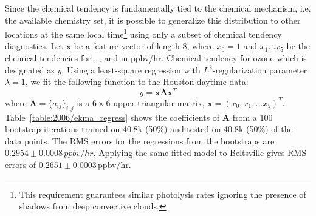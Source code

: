 Since the chemical tendency is fundamentally tied to the chemical mechanism, i.e. the available chemistry set, it is possible to generalize this distribution to other
locations at the same local time\footnote{This requirement guarantees similar photolysis rates ignoring the presence of shadows from deep convective clouds.}
using only a subset of chemical tendency diagnostics. Let $\mathbf{x}$ be a feature vector of length 8, where $x_0=1$ and $x_1\ldots x_5$ be the chemical
tendencies for , , and  in \unit{ppbv/hr}. Chemical tendency for ozone which is designated as $y$. Using a least-square
regression with $L^2$-regularization parameter $\lambda=1$, we fit the following function to the Houston daytime data:
\begin{equation}\label{eqn:chem_ekma}
	y = \mathbf{x}\mathbf{A}\mathbf{x}^T
\end{equation}
where $\mathbf{A}=\{a_{ij}\}_{i,j}$ is a $6\times6$ upper triangular matrix, $\mathbf{x}=(x_0,x_1,\ldots x_5)^T$. Table~\ref{table:2006/ekma_regress}
shows the coefficients of $\mathbf{A}$ from a 100 bootstrap iterations trained on 40.8k (50\%) and tested on 40.8k (50\%) of the data points. The
RMS errors for the regressions from the bootstraps are $0.2954\pm0.0008\,\unit{ppbv/hr}$. Applying the same fitted model to Beltsville gives RMS
errors of $0.2651\pm0.0003$\,\unit{ppbv/hr}.

